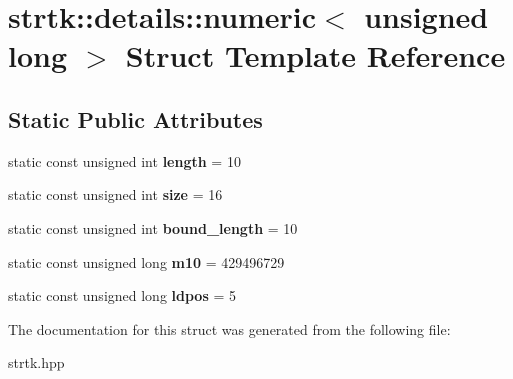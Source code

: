 \hypertarget{structstrtk_1_1details_1_1numeric_3_01unsigned_01long_01_4}{\section{strtk\-:\-:details\-:\-:numeric$<$ unsigned long $>$ Struct Template Reference}
\label{structstrtk_1_1details_1_1numeric_3_01unsigned_01long_01_4}
}
\subsection*{Static Public Attributes}
\begin{DoxyCompactItemize}
\item 
\hypertarget{structstrtk_1_1details_1_1numeric_3_01unsigned_01long_01_4_a0fca4cd558b0e4a0d4759b8c983b7aa8}{static const unsigned int {\bfseries length} = 10}\label{structstrtk_1_1details_1_1numeric_3_01unsigned_01long_01_4_a0fca4cd558b0e4a0d4759b8c983b7aa8}

\item 
\hypertarget{structstrtk_1_1details_1_1numeric_3_01unsigned_01long_01_4_ad5f744c168d4e910ed1419377b68d97d}{static const unsigned int {\bfseries size} = 16}\label{structstrtk_1_1details_1_1numeric_3_01unsigned_01long_01_4_ad5f744c168d4e910ed1419377b68d97d}

\item 
\hypertarget{structstrtk_1_1details_1_1numeric_3_01unsigned_01long_01_4_a66a5f3a7a7e4479e6cffb8f7c6a89f41}{static const unsigned int {\bfseries bound\-\_\-length} = 10}\label{structstrtk_1_1details_1_1numeric_3_01unsigned_01long_01_4_a66a5f3a7a7e4479e6cffb8f7c6a89f41}

\item 
\hypertarget{structstrtk_1_1details_1_1numeric_3_01unsigned_01long_01_4_a26488d10283bb7a9aed94b7f4f0f9378}{static const unsigned long {\bfseries m10} = 429496729}\label{structstrtk_1_1details_1_1numeric_3_01unsigned_01long_01_4_a26488d10283bb7a9aed94b7f4f0f9378}

\item 
\hypertarget{structstrtk_1_1details_1_1numeric_3_01unsigned_01long_01_4_a2b778e42dd9edcbbbaf1ac0e1353e52d}{static const unsigned long {\bfseries ldpos} = 5}\label{structstrtk_1_1details_1_1numeric_3_01unsigned_01long_01_4_a2b778e42dd9edcbbbaf1ac0e1353e52d}

\end{DoxyCompactItemize}


The documentation for this struct was generated from the following file\-:\begin{DoxyCompactItemize}
\item 
strtk.\-hpp\end{DoxyCompactItemize}
